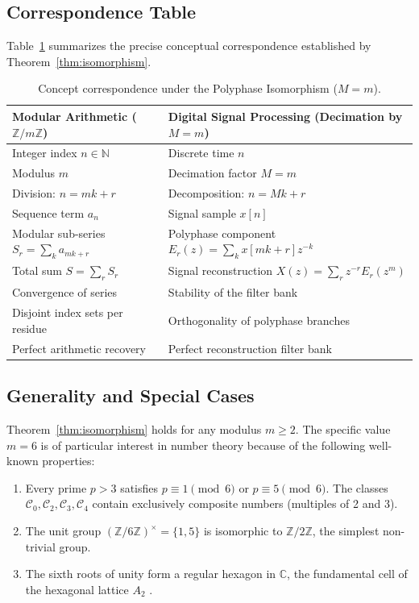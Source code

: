 \documentclass[12pt,a4paper]{article}
\theoremstyle{plain}
\theoremstyle{definition}
\theoremstyle{remark}
\begin{document}
\subsection{Correspondence Table}
Table~\ref{tab:isomorphism} summarizes the precise conceptual correspondence established by Theorem~\ref{thm:isomorphism}.

\begin{table}[H]
\centering
\caption{Concept correspondence under the Polyphase Isomorphism (\(M=m\)).}
\label{tab:isomorphism}
\begin{tabular}{ll}
\toprule
\textbf{Modular Arithmetic (\(\mathbb{Z}/m\mathbb{Z}\))} & \textbf{Digital Signal Processing (Decimation by \(M=m\))} \\
\midrule
Integer index \(n \in \mathbb{N}\) & Discrete time \(n\) \\
Modulus \(m\) & Decimation factor \(M=m\) \\
Division: \(n = mk + r\) & Decomposition: \(n = M k + r\) \\
Sequence term \(a_n\) & Signal sample \(x[n]\) \\
Modular sub-series \(S_r = \sum_k a_{mk+r}\) & Polyphase component \(E_r(z) = \sum_k x[mk+r] z^{-k}\) \\
Total sum \(S = \sum_{r} S_r\) & Signal reconstruction \(X(z) = \sum_r z^{-r} E_r(z^m)\) \\
Convergence of series & Stability of the filter bank \\
Disjoint index sets per residue & Orthogonality of polyphase branches \\
Perfect arithmetic recovery & Perfect reconstruction filter bank \\
\bottomrule
\end{tabular}
\end{table}

\subsection{Generality and Special Cases}
Theorem~\ref{thm:isomorphism} holds for any modulus \(m \ge 2\). The specific value \(m=6\) is of particular interest in number theory because of the following well-known properties:

\begin{enumerate}[label=(\roman*)]
    \item Every prime \(p > 3\) satisfies \(p \equiv 1 \pmod{6}\) or \(p \equiv 5 \pmod{6}\). The classes \(\mathcal{C}_0, \mathcal{C}_2, \mathcal{C}_3, \mathcal{C}_4\) contain exclusively composite numbers (multiples of 2 and 3).
    \item The unit group \((\mathbb{Z}/6\mathbb{Z})^{\times} = \{1,5\}\) is isomorphic to \(\mathbb{Z}/2\mathbb{Z}\), the simplest non-trivial group.
    \item The sixth roots of unity form a regular hexagon in \(\mathbb{C}\), the fundamental cell of the hexagonal lattice \(A_2\) \cite{conway1999sphere}.
\end{enumerate}
\end{document}
